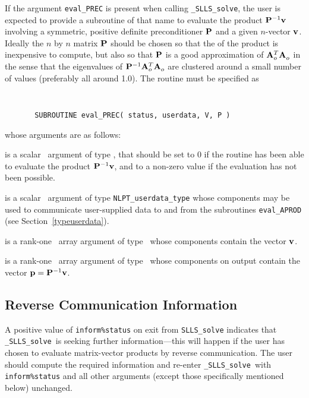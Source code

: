 \documentclass{galahad}
\newcommand{\packagename}{SLLS}
\newcommand{\fullpackagename}{\libraryname\_\packagename}
\newcommand{\solver}{{\tt \fullpackagename\_solve}}
\begin{document}
If the argument {\tt eval\_PREC} is present when calling \solver, the
user is expected to provide a subroutine of that name to evaluate the
product ${\mathbf{P}}^{-1} {\mathbf{v}}$ involving a symmetric, positive definite 
preconditioner ${\mathbf{P}}$ and a given $n$-vector ${\mathbf{v}}$.
Ideally the $n$ by $n$ matrix ${\mathbf{P}}$ should be chosen so that the
of the product is inexpensive to compute, but also so that ${\mathbf{P}}$ is
a good approximation of ${\mathbf{A}}_o^T {\mathbf{A}}_o^{}$ in the sense that the eigenvalues
of ${\mathbf{P}}^{-1} {\mathbf{A}}_o^T {\mathbf{A}}_o^{}$ are clustered around a small number of values
(preferably all around 1.0). The routine must be specified as

\def\baselinestretch{0.8}
{\tt
\begin{verbatim}
       SUBROUTINE eval_PREC( status, userdata, V, P )
\end{verbatim} }
\def\baselinestretch{1.0}
\noindent whose arguments are as follows:

\begin{description}
 is a scalar \intentout\ argument of type \integer,
that should be set to 0 if the routine has been able to evaluate the
product ${\mathbf{P}}^{-1} {\mathbf{v}}$, 
and to a non-zero value if the evaluation has not been possible.

 is a scalar \intentinout\ argument of type
{\tt NLPT\_userdata\_type} whose components may be used
to communicate user-supplied data to and from the subroutines
{\tt eval\_APROD}
(see Section~\ref{typeuserdata}).

 is a rank-one \intentin\ array argument of type \realdp\
whose components contain the vector ${\mathbf{v}}$.

 is a rank-one \intentinout\ array argument of type \realdp\
whose components on output contain the vector ${\mathbf{p}} = {\mathbf{P}}^{-1} {\mathbf{v}}$.

\end{description}



\subsection{\label{reverse}Reverse Communication Information}

A positive value of {\tt inform\%status} on exit from
{\tt \packagename\_solve}
indicates that
\solver\ is seeking further information---this will happen
if the user has chosen to evaluate matrix-vector products by
reverse communication.
The user should compute the required information and re-enter \solver\
with {\tt inform\%status} and all other arguments (except those specifically
mentioned below) unchanged.
\end{document}
